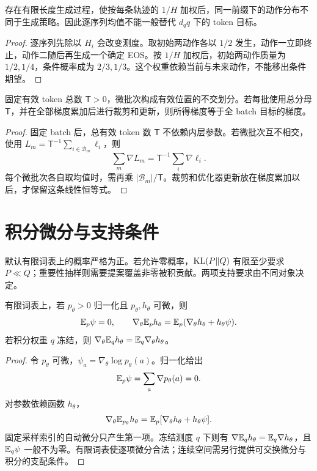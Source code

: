 \begin{proposition}[逐序列长度权重改变动作分布]
存在有限长度生成过程，使按每条轨迹的 $1/H$ 加权后，同一前缀下的动作分布不同于生成策略。因此逐序列均值不能一般替代 $d_qq$ 下的 token 目标。
\end{proposition}
\begin{proof}
逐序列先除以 $H_i$ 会改变测度。取初始两动作各以 $1/2$ 发生，动作一立即终止，动作二随后再生成一个确定 EOS。按 $1/H$ 加权后，初始两动作质量为 $1/2,1/4$，条件概率成为 $2/3,1/3$。这个权重依赖当前与未来动作，不能移出条件期望。
\end{proof}

\begin{proposition}[微批次梯度累加不变性]
固定有效 token 总数 $\mathsf T>0$，微批次构成有效位置的不交划分。若每批使用总分母 $\mathsf T$，并在全部梯度累加后进行裁剪和更新，则所得梯度等于全 batch 目标的梯度。
\end{proposition}
\begin{proof}
固定 batch 后，总有效 token 数 $\mathsf T$ 不依赖内层参数。若微批次互不相交，使用 $L_m=\mathsf T^{-1}\sum_{i\in\mathcal B_m}\ell_i$，则
\begin{equation}
\sum_m\nabla L_m=\mathsf T^{-1}\sum_i\nabla\ell_i.
\end{equation}
每个微批次各自取均值时，需再乘 $|\mathcal B_m|/\mathsf T$。裁剪和优化器更新放在梯度累加以后，才保留这条线性恒等式。
\end{proof}

\section{积分微分与支持条件}
默认有限词表上的概率严格为正。若允许零概率，$\operatorname{KL}(P\Vert Q)$ 有限至少要求 $P\ll Q$；重要性抽样则需要提案覆盖非零被积贡献。两项支持要求由不同对象决定。

\begin{lemma}
有限词表上，若 $p_\theta>0$ 归一化且 $p_\theta,h_\theta$ 可微，则
\begin{equation}
\mathbb E_p\psi=0,\qquad
\nabla_\theta\mathbb E_ph_\theta=\mathbb E_p(\nabla_\theta h_\theta+h_\theta\psi).
\end{equation}
若积分权重 $q$ 冻结，则 $\nabla_\theta\mathbb E_qh_\theta=\mathbb E_q\nabla_\theta h_\theta$。
\end{lemma}
\begin{proof}
令 $p_\theta$ 可微，$\psi_a=\nabla_\theta\log p_\theta(a)$。归一化给出
\begin{equation}
\mathbb E_p\psi=\sum_a\nabla p_\theta(a)=0.
\end{equation}
对参数依赖函数 $h_\theta$，
\begin{equation}
\nabla_\theta\mathbb E_{p_\theta}h_\theta
=\mathbb E_p[\nabla_\theta h_\theta+h_\theta\psi].
\label{eq:measure-derivative}
\end{equation}
固定采样索引的自动微分只产生第一项。冻结测度 $q$ 下则有 $\nabla\mathbb E_qh_\theta=\mathbb E_q\nabla h_\theta$，且 $\mathbb E_q\psi$ 一般不为零。有限词表使逐项微分合法；连续空间需另行提供可交换微分与积分的支配条件。
\end{proof}

